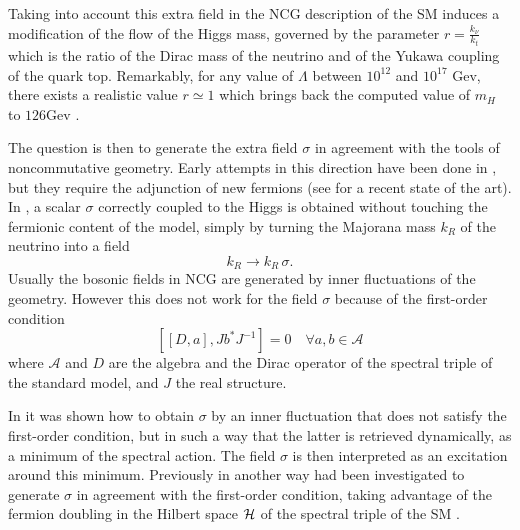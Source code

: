 \documentclass[11pt]{article}
\newcommand{\A}{\mathcal A}
\begin{document}
Taking into account this extra field in the
NCG description of the SM induces a modification of the flow of the
Higgs mass, governed by the parameter $r=\frac{k_\nu}{k_t}$ which is the
ratio of the Dirac mass of the neutrino and of the Yukawa coupling of the quark top. Remarkably, for any value of 
$\Lambda$ between $10^{12}$ and $10^{17}$ Gev, there exists a
realistic value $r\simeq 1$  which brings back the computed value of
$m_H$ to $126 \text{
  Gev}$ \cite{Chamseddine:2012fk}.

The question is then to generate the extra field
$\sigma$ in agreement with the tools of noncommutative
geometry. Early attempts in this direction have been done in \cite{Stephan:2009fk}, but they require the
adjunction of new fermions (see \cite{Stephan:2013fk} for a
recent state of the art). In \cite{Chamseddine:2012fk}, a scalar $\sigma$ correctly coupled to the
Higgs is obtained without touching the fermionic content of the model,
simply by turning the Majorana mass $k_R$ of the neutrino into a field
\begin{equation}
  \label{eq:114}
  k_R \to k_R\, \sigma.
\end{equation}
Usually the bosonic fields in NCG are generated by inner
fluctuations of the geometry. However this does not work for the field
$\sigma$ because
of the first-order
condition
\begin{equation}
  \label{eq:121}
  [[D,a], Jb^*J^{-1}] = 0 \quad \forall a,b \in \A
\end{equation}
where $\A$ and $D$ are the algebra and the Dirac operator of the
spectral triple of the standard model, and $J$ the real structure.
 
In \cite{Chamseddine:2013fk,Chamseddine:2013uq} it was
shown how to obtain $\sigma$ by an inner fluctuation
that does not satisfy the first-order condition, but in such a way that
the latter is retrieved dynamically, as a minimum of the spectral
action. The field $\sigma$ is then interpreted as an excitation around this
minimum. Previously in \cite{Devastato:2013fk} another way had been
investigated  to generate 
$\sigma$ in agreement with the first-order condition, taking advantage of the fermion doubling in the Hilbert space $\cal H$ of the spectral
  triple of the SM \cite{fermionsdoublingNapoli2,
    fermiondoublingNaples1, fermiondoublingMarseille}. 
\end{document}
